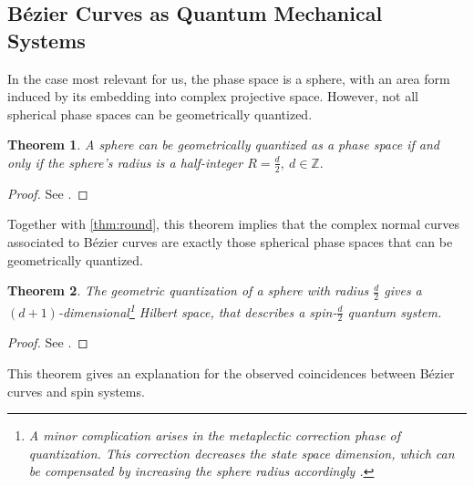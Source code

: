 \documentclass[final,3p,mathptmx]{elsarticle}
\newtheorem{theorem}{Theorem}
\begin{document}
\subsection{B\'{e}zier Curves as Quantum Mechanical Systems}
In the case most relevant for us, the phase space is a sphere, with an area form induced by its embedding into complex projective space. However, not all spherical phase spaces can be geometrically quantized.  
\begin{theorem}
	A sphere can be geometrically quantized as a phase space if and only if the sphere's radius is a half-integer $R = \frac{d}{2},\ d \in \mathbb{Z}.$
\end{theorem} 
\begin{proof}
	See \cite{nlab2016geometric}.
\end{proof}
Together with \autoref{thm:round}, this theorem implies that the complex normal curves associated to B\'{e}zier curves are exactly those spherical phase spaces that can be geometrically quantized.
\begin{theorem}
	The geometric quantization of a sphere with radius $\frac{d}{2}$ gives a $(d+1)$-dimensional\footnote{A minor complication arises in the metaplectic correction phase of quantization. This correction decreases the state space dimension, which can be compensated by increasing the sphere radius accordingly \cite{nlab2016geometric}.} Hilbert space, that describes a spin-$\frac{d}{2}$ quantum system. 
\end{theorem}
\begin{proof}
	See \cite[Ch. 4.2]{blau1992symplectic}.
\end{proof}
This theorem gives an explanation for the observed coincidences between B\'{e}zier curves and spin systems. 
\end{document}
